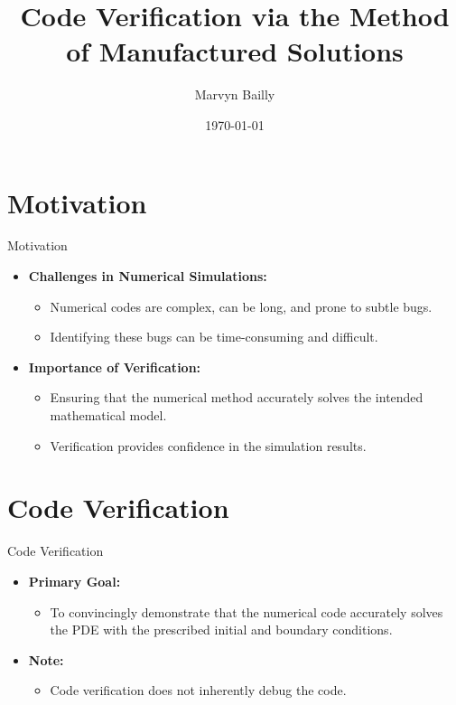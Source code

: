 \documentclass{beamer}
\title{Code Verification via the Method of Manufactured Solutions}
\author{Marvyn Bailly}
\date{\today}
\begin{document}
\begin{frame}
    \titlepage
\end{frame}

\section{Motivation}

\begin{frame}{Motivation}
    \begin{itemize}
        \item \textbf{Challenges in Numerical Simulations:}
            \begin{itemize}
                \item Numerical codes are complex, can be long, and prone to subtle bugs.
                \item Identifying these bugs can be time-consuming and difficult.
            \end{itemize}
        \item \textbf{Importance of Verification:}
            \begin{itemize}
                \item Ensuring that the numerical method accurately solves the intended mathematical model.
                \item Verification provides confidence in the simulation results.
            \end{itemize}
    \end{itemize}
\end{frame}


\section{Code Verification}

\begin{frame}{Code Verification}
    \begin{itemize}
        \item \textbf{Primary Goal:}
            \begin{itemize}
                \item To convincingly demonstrate that the numerical code accurately solves the PDE with the prescribed initial and boundary conditions.
            \end{itemize}

            \item \textbf{Note:}
            \begin{itemize}
                \item Code verification does not inherently debug the code.
            \end{itemize}
    \end{itemize}
\end{frame}
\end{document}

